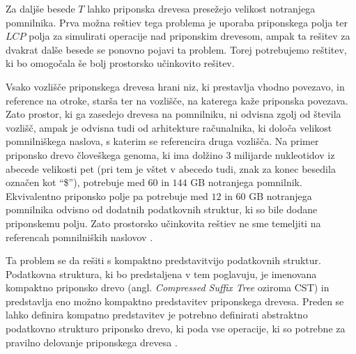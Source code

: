 Za daljše besede $T$ lahko priponska drevesa presežejo velikost notranjega pomnilnika. Prva možna reštiev tega problema je uporaba priponskega polja ter $LCP$ polja za simulirati operacije nad priponskim drevesom, ampak ta rešitev za dvakrat dalše besede se ponovno pojavi ta problem. Torej potrebujemo reštitev, ki bo omogočala še bolj prostorsko učinkovito rešitev. 

Vsako vozlišče priponskega drevesa hrani niz, ki prestavlja vhodno povezavo, in reference na otroke, starša ter na vozlišče, na katerega kaže priponska povezava. Zato prostor, ki ga zasedejo drevesa na pomnilniku, ni odvisna zgolj od števila vozlišč, ampak je odvisna tudi od arhitekture računalnika, ki določa velikost pomnilniškega naslova, s katerim se referencira druga vozlišča. Na primer priponsko drevo človeškega genoma, ki ima dolžino 3 milijarde nukleotidov iz abecede velikosti pet (pri tem je vštet v abecedo tudi, znak za konec besedila označen kot \enquote{\$}), potrebuje med $60$ in $144$ GB notranjega pomnilnik. Ekvivalentno priponsko polje pa potrebuje med $12$ in $60$ GB notranjega pomnilnika odvisno od dodatnih podatkovnih struktur, ki so bile dodane priponskemu polju. Zato prostorsko učinkovita reštiev ne sme temeljiti na referencah pomnilniških naslovov \cite{GENOMEKNOWLEDGEHUB-2024-10-30}.

Ta problem se da rešiti s kompaktno predstavitvijo podatkovnih struktur. Podatkovna struktura, ki bo predstaljena v tem poglavuju, je imenovana kompaktno priponsko drevo (angl. \textit{Compressed Suffix Tree} oziroma CST) in predstavlja eno možno kompaktno predstavitev priponskega drevesa. Preden se lahko definira kompatno predstavitev je potrebno definirati abstraktno podatkovno strukturo priponsko drevo, ki poda vse operacije, ki so potrebne za pravilno delovanje priponskega drevesa \cite{Sadakane2007}.

